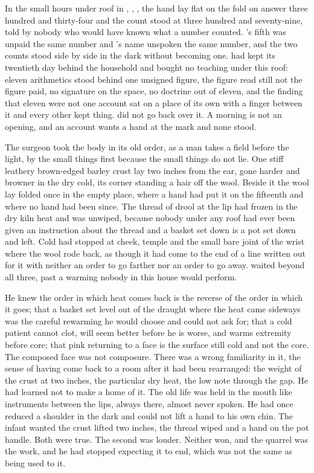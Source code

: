 
In the small hours under  roof in , , , the hand lay flat on the fold on answer three hundred and thirty-four and the count stood at three hundred and seventy-nine, told by nobody who would have known what a number counted. 's fifth was unpaid the same number and 's name unspoken the same number, and the two counts stood side by side in the dark without becoming one.  had kept its twentieth day behind the household and bought no teaching under this roof: eleven arithmetics stood behind one unsigned figure, the figure read still not the figure paid, no signature on the space, no doctrine out of eleven, and the finding that eleven were not one account sat on a place of its own with a finger between it and every other kept thing.  did not go back over it. A morning is not an opening, and an account wants a hand at the mark and none stood.

The surgeon took the body in its old order, as a man takes a field before the light, by the small things first because the small things do not lie. One stiff leathery brown-edged barley crust lay two inches from the ear, gone harder and browner in the dry cold, its corner standing a hair off the wool. Beside it the wool lay folded once in the empty place, where a hand had put it on the fifteenth and where no hand had been since. The thread of drool at the lip had frozen in the dry kiln heat and was unwiped, because nobody under any roof had ever been given an instruction about the thread and a basket set down is a pot set down and left. Cold had stopped at cheek, temple and the small bare joint of the wrist where the wool rode back, as though it had come to the end of a line written out for it with neither an order to go farther nor an order to go away.  waited beyond all three, past a warming nobody in this house would perform.

He knew the order in which heat comes back is the reverse of the order in which it goes; that a basket set level out of the draught where the heat came sideways was the careful rewarming he would choose and could not ask for; that a cold patient cannot clot, will seem better before he is worse, and warms extremity before core; that pink returning to a face is the surface still cold and not the core. The composed face was not composure. There was a wrong familiarity in it, the sense of having come back to a room after it had been rearranged: the weight of the crust at two inches, the particular dry heat, the low note through the gap. He had learned not to make a home of it. The old life was held in the mouth like instruments between the lips, always there, almost never spoken. He had once reduced a shoulder in the dark and could not lift a hand to his own chin. The infant wanted the crust lifted two inches, the thread wiped and a hand on the pot handle. Both were true. The second was louder. Neither won, and the quarrel was the work, and he had stopped expecting it to end, which was not the same as being used to it.


